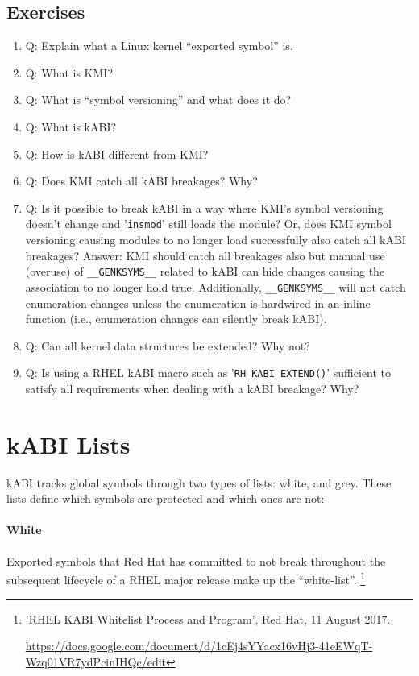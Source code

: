 \documentclass[10pt,oneside,english]{book}
\begin{document}
\section{Exercises}
\begin{enumerate}
\item Q: Explain what a Linux kernel ``exported symbol'' is. 
\item Q: What is KMI? 
\item Q: What is ``symbol versioning'' and what does it do? 
\item Q: What is kABI? 
\item Q: How is kABI different from KMI? 
\item Q: Does KMI catch all kABI breakages? Why? 
\item Q: Is it possible to break kABI in a way where KMI's symbol versioning
doesn't change and '\texttt{insmod}' still loads the module? Or, does
KMI symbol versioning causing modules to no longer load successfully
also catch all kABI breakages?  Answer: KMI should catch all breakages also but manual use (overuse)
of \texttt{\_\_GENKSYMS\_\_} related to kABI can hide changes causing
the association to no longer hold true. Additionally, \texttt{\_\_GENKSYMS\_\_}
will not catch enumeration changes unless the enumeration is hardwired
in an inline function (i.e., enumeration changes can silently break
kABI). 
\item Q: Can all kernel data structures be extended? Why not? 
\item Q: Is using a RHEL kABI macro such as '\texttt{RH\_KABI\_EXTEND()}'
sufficient to satisfy all requirements when dealing with a kABI breakage?
Why?\pagebreak{}
\end{enumerate}

\appendix

\chapter{kABI Lists\label{chap:kABI-Lists}}

kABI tracks global symbols through two types of lists: white, and
grey. These lists define which symbols are protected and which ones
are not:

\subsubsection{White}

Exported symbols that Red Hat has committed to not break throughout
the subsequent lifecycle of a RHEL major release make up the ``white-list''.
\footnote{'RHEL KABI Whitelist Process and Program', Red Hat, 11 August 2017.

\url{https://docs.google.com/document/d/1cEj4sYYacx16vHj3-41eEWqT-Wzq01VR7ydPcinIHQc/edit}}
\end{document}
